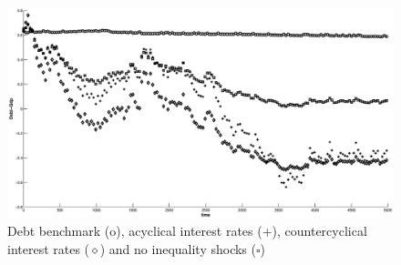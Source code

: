 \documentclass[thmsb,11pt]{article}
\begin{document}

  \begin{figure}[htp]
 \centering
 \includegraphics[width=\textwidth]{Draft25Graphs/LongSimulations.eps}
 \caption{Debt benchmark (o), acyclical interest rates (+), countercyclical interest rates ($\diamond$) and no inequality shocks \scriptsize ($\square$\normalsize) }
 \label{fig:LongSimulations}
 \end{figure}

\smallskip
\end{document}
